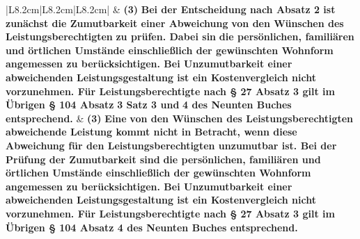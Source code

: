 \documentclass[10pt,a4paper,landscape]{article}
\begin{document}
\begin{longtable}{|L{8.2cm}|L{8.2cm}|L{8.2cm}|}
 & \textbf{(3) }\textbf{\textcolor{diffred}{Bei der Entscheidung nach Absatz 2  \newline ist zunächst die Zumutbarkeit einer  \newline Abweichung}}\textbf{ von den Wünschen des  \newline Leistungsberechtigten }\textbf{\textcolor{diffred}{zu prüfen. Dabei  \newline sin}}\textbf{ die persönlichen, familiären und  \newline örtlichen Umstände einschließlich der  \newline gewünschten Wohnform angemessen  \newline zu berücksichtigen. Bei Unzumutbarkeit  \newline einer abweichenden  \newline Leistungsgestaltung ist ein  \newline Kostenvergleich nicht vorzunehmen.  \newline Für Leistungsberechtigte nach \S{} 27  \newline Absatz 3 gilt im Übrigen \S{} 104 Absatz }\textbf{\textcolor{diffred}{3  \newline Satz 3 und}}\textbf{ 4 des Neunten Buches  \newline entsprechend. } & \textbf{(3) }\textbf{\textcolor{diffgreen}{Eine}}\textbf{ von den Wünschen des  \newline Leistungsberechtigten }\textbf{\textcolor{diffgreen}{abweichende  \newline Leistung kommt nicht in Betracht, wenn  \newline diese Abweichung für den  \newline Leistungsberechtigten unzumutbar ist.  \newline Bei der Prüfung der Zumutbarkeit sind}}\textbf{  \newline die persönlichen, familiären und  \newline örtlichen Umstände einschließlich der  \newline gewünschten Wohnform angemessen  \newline zu berücksichtigen. Bei Unzumutbarkeit  \newline einer abweichenden  \newline Leistungsgestaltung ist ein  \newline Kostenvergleich nicht vorzunehmen.  \newline Für Leistungsberechtigte nach \S{} 27  \newline Absatz 3 gilt im Übrigen \S{} 104 Absatz 4  \newline des Neunten Buches entsprechend. } \\

\end{longtable}
\end{document}
